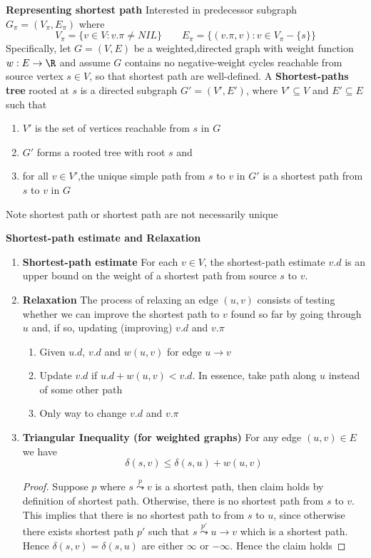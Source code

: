 \documentclass[11pt]{article}
\begin{document}
\begin{defn*}
    \textbf{Representing shortest path} Interested in predecessor subgraph $G_{\pi} = (V_{\pi}, E_{\pi})$ where
    \[
        V_{\pi} = \{ v\in V: v.\pi \neq NIL\} \quad \quad E_{\pi} = \{ (v.\pi, v): v\in V_{\pi} - \{s\}\}
    \]
    Specifically, let $G = (V,E)$ be a weighted,directed graph with weight function $w:E\to \R$ and assume $G$ contains no negative-weight cycles reachable from source vertex $s\in V$, so that shortest path are well-defined. A \textbf{Shortest-paths tree} rooted at $s$ is a directed subgraph $G' = (V', E')$, where $V' \subseteq V$ and $E' \subseteq E$ such that 
    \begin{enumerate}
        \item $V'$ is the set of vertices reachable from $s$ in $G$
        \item $G'$ forms a rooted tree with root $s$ and 
        \item for all $v\in V'$,the unique simple path from $s$ to $v$ in $G'$ is a shortest path from $s$ to $v$ in $G$
    \end{enumerate}
    Note shortest path or shortest path are not necessarily unique
\end{defn*}


\begin{proposition*}
    \textbf{Shortest-path estimate and Relaxation}
    \begin{enumerate}
        \item \textbf{Shortest-path estimate} For each $v\in V$, the shortest-path estimate $v.d$ is an upper bound on the weight of a shortest path from source $s$ to $v$. 
        \item \textbf{Relaxation} The process of relaxing an edge $(u,v)$ consists of testing whether we can improve the shortest path to $v$ found so far by going through $u$ and, if so, updating (improving) $v.d$ and $v.\pi$
        \begin{enumerate}
            \item Given $u.d$, $v.d$ and $w(u,v)$ for edge $u \to v$ 
            \item Update $v.d$ if $u.d + w(u,v) < v.d$. In essence, take path along $u$ instead of some other path
            \item Only way to change $v.d$ and $v.\pi$
        \end{enumerate}
        \item \textbf{Triangular Inequality (for weighted graphs)} For any edge $(u,v) \in E$ we have 
        \[
            \delta(s,v) \leq \delta(s,u) + w(u,v)
        \]
        \begin{proof}
            Suppose $p$ where $s\overset{p}{\leadsto} v$ is a shortest path, then claim holds by definition of shortest path. Otherwise, there is no shortest path from $s$ to $v$. This implies that there is no shortest path to from $s$ to $u$, since otherwise there exists shortest path $p'$ such that  $s \overset{p'}{\leadsto} u \to v$ which is a shortest path. Hence $\delta(s,v) = \delta(s,u)$ are either $\infty$ or $-\infty$. Hence the claim holds 
        \end{proof}
    \end{enumerate}
\end{proposition*}
\end{document}
